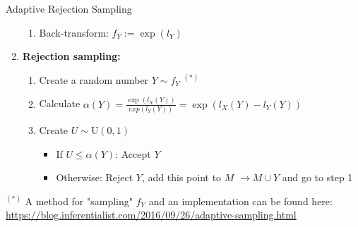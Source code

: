 \documentclass[11pt,compress,t,notes=noshow, xcolor=table]{beamer}
\begin{document}
\begin{vbframe}{Adaptive Rejection Sampling}
\begin{enumerate}
\begin{enumerate}

\item Back-transform: $f_Y := \exp(l_Y)$

\framebreak


\end{enumerate}
\item \textbf{Rejection sampling:}
\begin{enumerate}
\item Create a random number $Y \sim f_Y$ $^{(*)}$
\item Calculate $ \alpha(Y) = \frac{\exp(l_X(Y))}{exp(l_Y(Y))} = \exp(l_X(Y) - l_Y(Y) )$
\item Create $U \sim \text{U}(0, 1)$
\begin{itemize}
\item If $U \le \alpha(Y)$: Accept $Y$
\item Otherwise: Reject $Y$, add this point to $M$ $\to M \cup Y$ and go to step 1
\end{itemize}

\end{enumerate}
\end{enumerate}

\vfill

\begin{footnotesize}
$^{(*)}$ A method for "sampling" $f_Y$ and an implementation can be found here: \\
\url{https://blog.inferentialist.com/2016/09/26/adaptive-sampling.html}
\end{footnotesize}

%
%


%
\end{vbframe}
\end{document}
